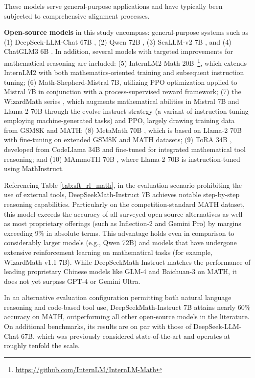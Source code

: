 These models serve general-purpose applications and have typically been subjected to comprehensive alignment processes.
    \item \textbf{Open-source models} in this study encompass: general-purpose systems such as (1) DeepSeek-LLM-Chat 67B \citep{deepseek-llm}, (2) Qwen 72B \citep{qwen}, (3) SeaLLM-v2 7B \citep{seallm}, and (4) ChatGLM3 6B \citep{chatglm3}. In addition, several models with targeted improvements for mathematical reasoning are included: (5) InternLM2-Math 20B~\footnote{\url{https://github.com/InternLM/InternLM-Math}}, which extends InternLM2 with both mathematics-oriented training and subsequent instruction tuning; (6) Math-Shepherd-Mistral 7B, utilizing PPO optimization \citep{schulman2017proximal} applied to Mistral 7B \citep{mistral} in conjunction with a process-supervised reward framework; (7) the WizardMath series \citep{wizardmath}, which augments mathematical abilities in Mistral 7B and Llama-2 70B \citep{llama2} through the evolve-instruct strategy (a variant of instruction tuning employing machine-generated tasks) and PPO, largely drawing training data from GSM8K and MATH; (8) MetaMath 70B \citep{metamath}, which is based on Llama-2 70B with fine-tuning on extended GSM8K and MATH datasets; (9) ToRA 34B \cite{tora}, developed from CodeLlama 34B and fine-tuned for integrated mathematical tool reasoning; and (10) MAmmoTH 70B \citep{MathInstruct}, where Llama-2 70B is instruction-tuned using MathInstruct.

Referencing Table \ref{tab:sft_rl_math}, in the evaluation scenario prohibiting the use of external tools, DeepSeekMath-Instruct 7B achieves notable step-by-step reasoning capabilities. Particularly on the competition-standard MATH dataset, this model exceeds the accuracy of all surveyed open-source alternatives as well as most proprietary offerings (such as Inflection-2 and Gemini Pro) by margins exceeding 9\% in absolute terms. This advantage holds even in comparison to considerably larger models (e.g., Qwen 72B) and models that have undergone extensive reinforcement learning on mathematical tasks (for example, WizardMath-v1.1 7B). While DeepSeekMath-Instruct matches the performance of leading proprietary Chinese models like GLM-4 and Baichuan-3 on MATH, it does not yet surpass GPT-4 or Gemini Ultra.

In an alternative evaluation configuration permitting both natural language reasoning and code-based tool use, DeepSeekMath-Instruct 7B attains nearly 60\% accuracy on MATH, outperforming all other open-source models in the literature. On additional benchmarks, its results are on par with those of DeepSeek-LLM-Chat 67B, which was previously considered state-of-the-art and operates at roughly tenfold the scale.

